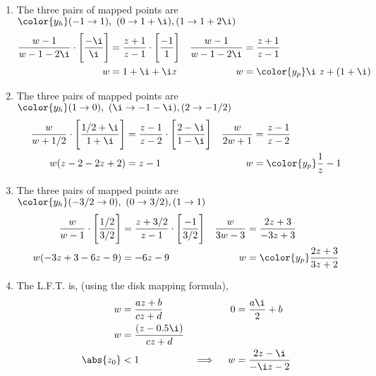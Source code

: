 \begin{enumerate}
    \item The three pairs of mapped points are
          $\color{y_h}  (-1 \to 1),\ (0 \to 1+\i), (1 \to 1+2\i) $
          \begin{align}
              \frac{w - 1}{w - 1 - 2\i} \cdot \Bigg[\frac{-\i}{\i}\Bigg]
                                        & = \frac{z + 1}{z - 1} \cdot
              \Bigg[ \frac{-1}{1}
              \Bigg]                    &
              \frac{w - 1}{w - 1 - 2\i} & = \frac{z + 1}{z - 1}            \\
              w                         & =  1 + \i + \i z               &
              w                         & = \color{y_p} \i\ z + (1 + \i)
          \end{align}

    \item The three pairs of mapped points are
          $\color{y_h}  (1 \to 0),\ (\i \to -1-\i), (2 \to -1/2) $
          \begin{align}
              \frac{w}{w + 1/2} \cdot \Bigg[\frac{1/2 + \i}{1 + \i}\Bigg]
                                & = \frac{z - 1}{z - 2} \cdot
              \Bigg[ \frac{2 - \i}{1 - \i}
              \Bigg]            &
              \frac{w}{2w + 1}  & = \frac{z - 1}{z - 2}           \\
              w(z - 2 - 2z + 2) & =  z - 1                      &
              w                 & = \color{y_p} \frac{1}{z} - 1
          \end{align}

    \item The three pairs of mapped points are
          $\color{y_h}  (-3/2 \to 0),\ (0 \to 3/2), (1 \to 1) $
          \begin{align}
              \frac{w}{w - 1} \cdot \Bigg[\frac{1/2}{3/2}\Bigg]
                                  & = \frac{z + 3/2}{z - 1} \cdot
              \Bigg[ \frac{-1}{3/2}
              \Bigg]              &
              \frac{w}{3w - 3}    & = \frac{2z + 3}{-3z + 3}              \\
              w(-3z + 3 - 6z - 9) & =  -6z - 9                          &
              w                   & = \color{y_p} \frac{2z + 3}{3z + 2}
          \end{align}

    \item The L.F.T. is, (using the disk mapping formula),
          \begin{align}
              w                & = \frac{az + b}{cz + d}      &
              0                & = \frac{a\i}{2} + b            \\
              w                & = \frac{(z - 0.5\i)}{cz + d}   \\
              \abs{z_0}        & < 1                          &
              \implies \quad w & = \frac{2z - \i}{-\i z - 2}
          \end{align}


\end{enumerate}
